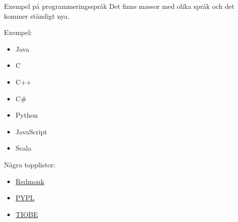 \begin{Slide}{Exempel på programmeringsspråk}
Det finns massor med olika språk och det kommer ständigt nya.
\vspace{1em}
\begin{multicols}{2}
Exempel:
\begin{itemize}
\item Java
\item C
\item C++
\item C\#
\item Python
\item JavaScript
\item Scala
\end{itemize}

\columnbreak %

Några topplistor:
\begin{itemize}
\item \href{https://redmonk.com/sogrady/2022/03/28/language-rankings-1-22/}{Redmonk}   
\item \href{http://pypl.github.io/PYPL.html}{PYPL}
\item \href{http://www.tiobe.com/index.php/content/paperinfo/tpci/index.html}{TIOBE}
\end{itemize}
\end{multicols}

\end{Slide}

